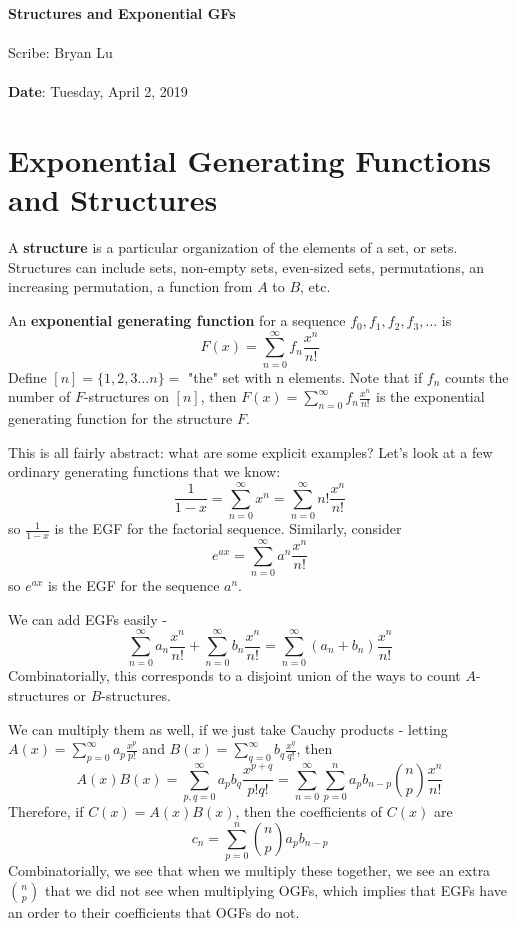 \documentclass[11pt,twosided]{article}
\def\titlestring{Structures and Exponential GFs}
\def\scribestring{Bryan Lu}
\def\datestring{Tuesday, April 2, 2019}
\begin{document}
\thispagestyle{plain}  %

\noindent
{\LARGE \textbf{\titlestring}}\\\\
%
{\Large Scribe: \scribestring}\\ \\
{\textbf{Date}: \datestring}


\noindent
\section{Exponential Generating Functions and Structures}

A \textbf{structure} is a particular organization of the elements of a set, or sets. Structures can include sets, non-empty sets, even-sized sets, permutations, an increasing permutation, a function from $A$ to $B$, etc. 

An \textbf{exponential generating function} for a sequence $f_0, f_1, f_2, f_3, \ldots$ is 
\[
	F(x) = \sum_{n=0}^\infty f_n \frac{x^n}{n!}
\]
Define $[n] = \{1, 2, 3 \ldots n\} =$ "the" set with n elements. Note that if $f_n$ counts the number of $F$-structures on $[n]$, then $F(x) = \sum_{n=0}^\infty f_n \frac{x^n}{n!}$ is the exponential generating function for the structure $F$. 

This is all fairly abstract: what are some explicit examples? Let's look at a few ordinary generating functions that we know: 
\[
	\frac{1}{1-x} = \sum_{n=0}^\infty x^n = \sum_{n=0}^\infty n! \frac{x^n}{n!}
\]
so $\frac{1}{1-x}$ is the EGF for the factorial sequence. Similarly, consider 
\[
	e^{ax} = \sum_{n=0}^\infty a^n \frac{x^n}{n!}
\]
so $e^{ax}$ is the EGF for the sequence $a^n$. 

We can add EGFs easily - 
\[
	 \sum_{n=0}^\infty a_n \frac{x^n}{n!} +  \sum_{n=0}^\infty b_n \frac{x^n}{n!} =  \sum_{n=0}^\infty (a_n + b_n) \frac{x^n}{n!}
\]
Combinatorially, this corresponds to a disjoint union of the ways to count $A$-structures or $B$-structures. 

We can multiply them as well, if we just take Cauchy products - letting $A(x) =  \sum_{p=0}^\infty a_p \frac{x^p}{p!}$ and $B(x) =  \sum_{q=0}^\infty b_q \frac{x^q}{q!}$, then 
\[
	A(x) B(x) = \sum_{p,q=0}^\infty a_p b_q \frac{x^{p+q}}{p!q!} =\sum_{n=0}^\infty \sum_{p=0}^n a_p b_{n-p} \binom{n}{p} \frac{x^n}{n!} 
\]
Therefore, if $C(x) = A(x) B(x)$, then the coefficients of $C(x)$ are
\[
	c_n = \sum_{p=0}^n \binom{n}{p} a_p b_{n-p}
\]
Combinatorially, we see that when we multiply these together, we see an extra $\binom{n}{p}$ that we did not see when multiplying OGFs, which implies that EGFs have an order to their coefficients that OGFs do not. 
\end{document}

